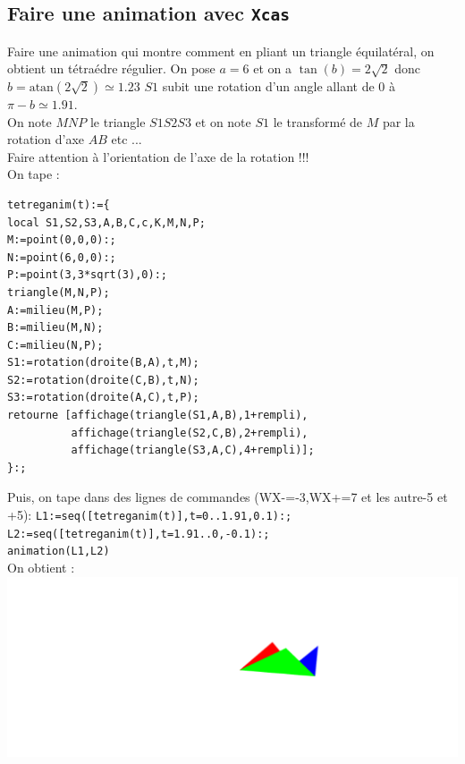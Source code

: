 \documentclass[a4paper,11pt]{book}
\newcommand{\atan}{\mbox{atan}}
\begin{document}
\subsection{Faire une animation avec {\tt Xcas}}
Faire une animation qui montre comment en pliant un triangle \'equilat\'eral,
 on obtient un t\'etra\'edre r\'egulier.
On pose $a=6$ et on a $\tan(b)=2\sqrt 2$ donc $b=\atan(2\sqrt 2)\simeq 1.23$
$S1$ subit une rotation d'un angle allant de 0 \`a $\pi-b\simeq 1.91$.\\
On note $MNP$ le triangle $S1S2S3$ et on note $S1$ le transform\'e de $M$ par 
la rotation d'axe $AB$ etc ...\\
Faire attention \`a l'orientation de l'axe de la rotation !!!\\
On tape :\\
\begin{verbatim}
tetreganim(t):={
local S1,S2,S3,A,B,C,c,K,M,N,P;
M:=point(0,0,0):;
N:=point(6,0,0):;
P:=point(3,3*sqrt(3),0):;
triangle(M,N,P);
A:=milieu(M,P);
B:=milieu(M,N);
C:=milieu(N,P);
S1:=rotation(droite(B,A),t,M);
S2:=rotation(droite(C,B),t,N);
S3:=rotation(droite(A,C),t,P);
retourne [affichage(triangle(S1,A,B),1+rempli),
          affichage(triangle(S2,C,B),2+rempli),
          affichage(triangle(S3,A,C),4+rempli)];
}:;
\end{verbatim}
Puis, on tape dans des lignes de commandes (WX-=-3,WX+=7 et les autre-5 et +5):
{\tt L1:=seq([tetreganim(t)],t=0..1.91,0.1):;}\\
{\tt L2:=seq([tetreganim(t)],t=1.91..0,-0.1):;}\\
{\tt animation(L1,L2)}\\
On obtient :\\
\includegraphics[width=\textwidth]{tetrareg}
\end{document}
